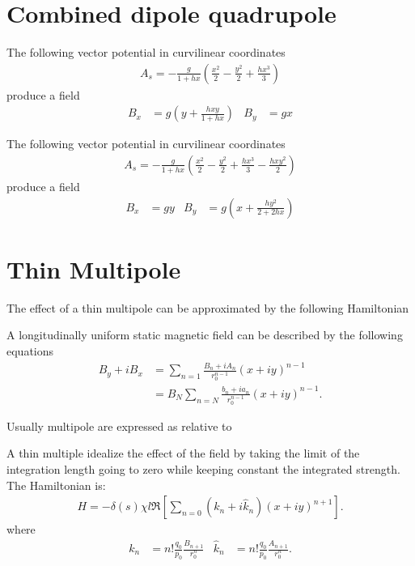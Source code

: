\documentclass[english]{article}
\begin{document}
\section{Combined dipole quadrupole}

The following vector potential in curvilinear coordinates
\begin{align}
A_s= -\frac{g}{1+h x}
    \left(\frac{x^2}{2} - \frac{y^2}{2} +
          \frac{h x^3}{3} \right)
\end{align}
produce a field 
\begin{align}
B_x&= g \left(y + \frac{h x y}{1+h x} \right) &
B_y&= g x 
\end{align}

The following vector potential in curvilinear coordinates
\begin{align}
A_s= -\frac{g}{1+h x}
    \left(\frac{x^2}{2} - \frac{y^2}{2} +
          \frac{h x^3}{3} -   \frac{h x y^2}{2} \right)
\end{align}
produce a field 
\begin{align}
B_x&= g y &
B_y&= g \left(x + \frac{h y^2}{2+2 h x} \right) 
\end{align}


\section{Thin Multipole}

The effect of a thin multipole can be approximated by the following Hamiltonian

A longitudinally uniform static magnetic field can be described by the following equations
\begin{align}
    B_y+iB_x&=\sum_{n=1}     \frac{B_n+iA_n}{r_0^{n-1}} (x+iy)^{n-1} \\
            &=B_N \sum_{n=N} \frac{b_n+ia_n}{r_0^{n-1}} (x+iy)^{n-1}  .
\end{align}

Usually multipole are expressed as relative to 

A thin multiple idealize the effect of the field by taking the limit of the integration 
length going to zero while keeping constant the integrated strength. The Hamiltonian is:
\begin{align}
  H=- \delta(s) \chi l \Re\left[\sum_{n=0} (k_n + i\hat k_n) (x+iy)^{n+1} \right].
\end{align}
where
\begin{align}
  k_n     &=  n!\frac{q_0}{p_0}  \frac{B_{n+1}}{r_0^n}  &
  \hat k_n&=  n!\frac{q_0}{p_0}  \frac{A_{n+1}}{r_0^n} .
\end{align}
\end{document}
